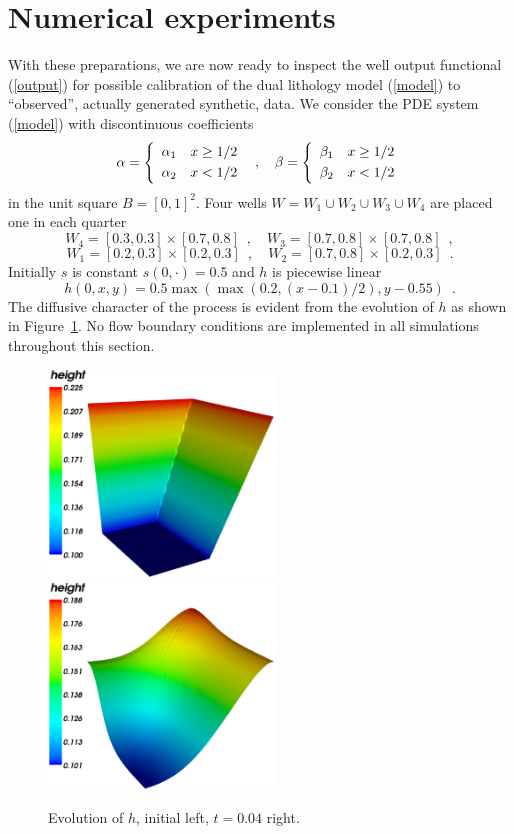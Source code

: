 \section{Numerical experiments}

With these preparations, we are now ready to inspect the well output functional (\ref{output}) 
for possible calibration of the dual lithology model (\ref{model}) to ``observed'', 
actually generated synthetic, data.
We consider the PDE system (\ref{model}) with discontinuous coefficients
$$
 \alpha = \left\{
 \begin{array}{rl} \alpha_1 & x \ge 1/2 \\[\jot] \alpha_2 & x < 1/2 \end{array}
 \right .
 \enspace , \quad
 \beta = \left\{
 \begin{array}{rl} \beta_1 & x \ge 1/2 \\[\jot] \beta_2 & x < 1/2 \end{array}
 \right .
$$
in the unit square $B=[0,1]^2$. 
Four wells $W = W_1 \cup W_2 \cup W_3 \cup W_4$
are placed one in each quarter 
$$
 W_4 = [0.3, 0.3] \times [0.7, 0.8] \enspace, \quad
 W_3 = [0.7, 0.8] \times [0.7, 0.8] \enspace,
$$
$$
 W_1 = [0.2, 0.3] \times [0.2, 0.3] \enspace, \quad
 W_2 = [0.7, 0.8] \times [0.2, 0.3] \enspace.
$$
Initially $s$ is constant $s(0,\cdot)=0.5$ and $h$ is piecewise linear
$$
 h(0,x,y) = 0.5 \max(\max(0.2, (x-0.1)/2), y-0.55) \enspace .
$$
The diffusive character of the process is evident from the evolution of $h$ as shown in Figure~\ref{fig1}.
No flow boundary conditions are implemented in all simulations throughout this section.
\begin{figure}
  \begin{center}
    \includegraphics[width=6cm]{chapters/schroll/eps/h0_typical.eps}
    \includegraphics[width=6cm]{chapters/schroll/eps/h_typical.eps}
  \end{center}
    \caption{Evolution of $h$, initial left, $t=0.04$ right.  \label{fig1}}
\end{figure}

